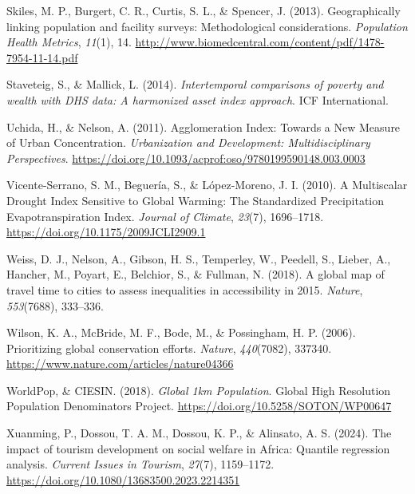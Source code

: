 \documentclass[
]{article}
\newlength{\cslhangindent}
\newenvironment{CSLReferences}[2] %
 {\begin{list}{}{%
  \setlength{\itemindent}{0pt}
  \setlength{\leftmargin}{0pt}
  \setlength{\parsep}{0pt}
  \ifodd #1
   \setlength{\leftmargin}{\cslhangindent}
   \setlength{\itemindent}{-1\cslhangindent}
  \fi
  \setlength{\itemsep}{#2\baselineskip}}}
 {\end{list}}
\begin{document}
\begin{CSLReferences}{1}{0}
Skiles, M. P., Burgert, C. R., Curtis, S. L., \& Spencer, J. (2013).
Geographically linking population and facility surveys: Methodological
considerations. \emph{Population Health Metrics}, \emph{11}(1), 14.
\url{http://www.biomedcentral.com/content/pdf/1478-7954-11-14.pdf}

Staveteig, S., \& Mallick, L. (2014). \emph{Intertemporal comparisons of
poverty and wealth with {DHS} data: {A} harmonized asset index
approach}. ICF International.

Uchida, H., \& Nelson, A. (2011). Agglomeration {Index}: {Towards} a
{New} {Measure} of {Urban} {Concentration}. \emph{Urbanization and
Development: Multidisciplinary Perspectives}.
\url{https://doi.org/10.1093/acprof:oso/9780199590148.003.0003}

Vicente-Serrano, S. M., Beguería, S., \& López-Moreno, J. I. (2010). A
{Multiscalar} {Drought} {Index} {Sensitive} to {Global} {Warming}: {The}
{Standardized} {Precipitation} {Evapotranspiration} {Index}.
\emph{Journal of Climate}, \emph{23}(7), 1696--1718.
\url{https://doi.org/10.1175/2009JCLI2909.1}

Weiss, D. J., Nelson, A., Gibson, H. S., Temperley, W., Peedell, S.,
Lieber, A., Hancher, M., Poyart, E., Belchior, S., \& Fullman, N.
(2018). A global map of travel time to cities to assess inequalities in
accessibility in 2015. \emph{Nature}, \emph{553}(7688), 333--336.

Wilson, K. A., McBride, M. F., Bode, M., \& Possingham, H. P. (2006).
Prioritizing global conservation efforts. \emph{Nature},
\emph{440}(7082), 337340.
\url{https://www.nature.com/articles/nature04366}

WorldPop, \& CIESIN. (2018). \emph{Global 1km {Population}}. Global High
Resolution Population Denominators Project.
\url{https://doi.org/10.5258/SOTON/WP00647}

Xuanming, P., Dossou, T. A. M., Dossou, K. P., \& Alinsato, A. S.
(2024). The impact of tourism development on social welfare in {Africa}:
Quantile regression analysis. \emph{Current Issues in Tourism},
\emph{27}(7), 1159--1172.
\url{https://doi.org/10.1080/13683500.2023.2214351}

\end{CSLReferences}
\end{document}
